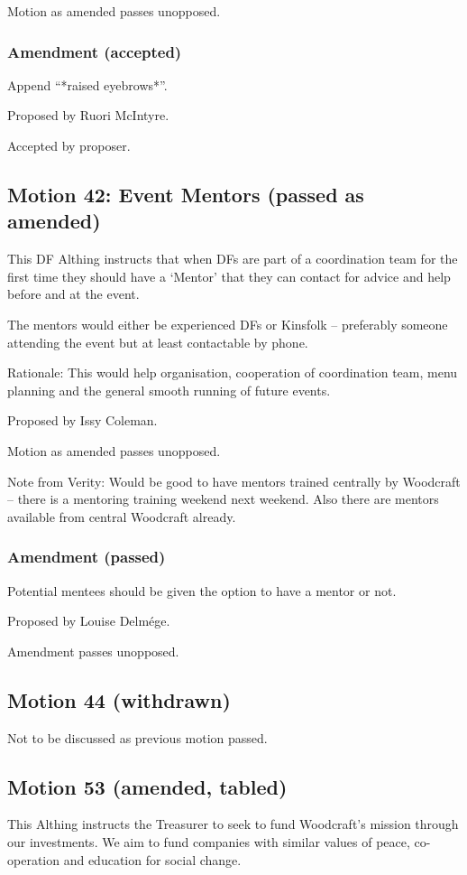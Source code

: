 \documentclass[a4paper, 12pt]{article}
\begin{document}
Motion as amended passes unopposed.

\subsubsection{Amendment (accepted)}
Append ``*raised eyebrows*''.

Proposed by Ruori McIntyre.

Accepted by proposer.

\subsection{Motion 42: Event Mentors (passed as amended)}
This DF Althing instructs that when DFs are part of a coordination team for the first time they should have a `Mentor' that they can contact for advice and help before and at the event.

The mentors would either be experienced DFs or Kinsfolk -- preferably someone attending the event but at least contactable by phone.

Rationale: This would help organisation, cooperation of coordination team, menu planning and the general smooth running of future events.

Proposed by Issy Coleman.

Motion as amended passes unopposed.

Note from Verity: Would be good to have mentors trained centrally by Woodcraft -- there is a mentoring training weekend next weekend. Also there are mentors available from central Woodcraft already.

\subsubsection{Amendment (passed)}
Potential mentees should be given the option to have a mentor or not.

Proposed by Louise Delmége.

Amendment passes unopposed.

\subsection{Motion 44 (withdrawn)}
Not to be discussed as previous motion passed.

\subsection{Motion 53 (amended, tabled)}
This Althing instructs the Treasurer to seek to fund Woodcraft's mission through our investments. We aim to fund companies with similar values of peace, co-operation and education for social change.
\end{document}
